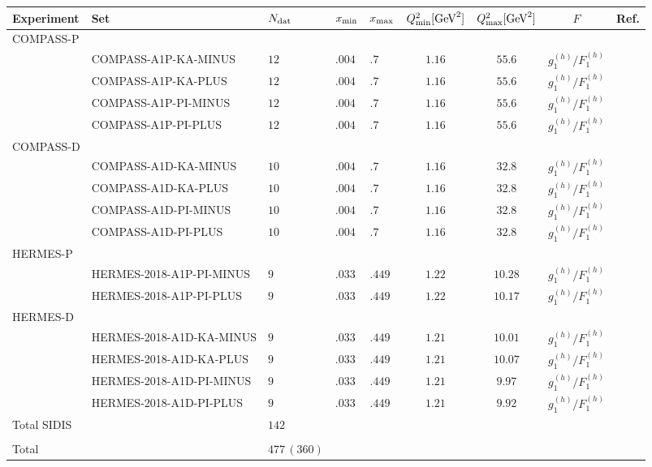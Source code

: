 \begin{tabularx}{1\pdfpagewidth}{llXXXcccc}
  \toprule \toprule
   Experiment    & Set       &  $N_{\textrm{dat}}$  &  $x_{\textrm{min}}$  &  $x_{\textrm{max}}$  & $Q^2_{\textrm{min}} [\textrm{GeV}^2]$ &  $Q^2_{\textrm{max}} [\textrm{GeV}^2]$ &    $F$    &  Ref. \\
  \midrule
   COMPASS-P 
     \\          & COMPASS-A1P-KA-MINUS & $12$ & $.004$ & $.7$ & $1.16$ & $55.6$ & $g_1^{(h)}/F_1^{(h)}$ & \cite{COMPASS:2010hwr} \\
                 & COMPASS-A1P-KA-PLUS & $12$ & $.004$ & $.7$ & $1.16$ & $55.6$ & $g_1^{(h)}/F_1^{(h)}$ & \cite{COMPASS:2010hwr} \\
                 & COMPASS-A1P-PI-MINUS & $12$ & $.004$ & $.7$ & $1.16$ & $55.6$ & $g_1^{(h)}/F_1^{(h)}$ & \cite{COMPASS:2010hwr} \\
                 & COMPASS-A1P-PI-PLUS & $12$ & $.004$ & $.7$ & $1.16$ & $55.6$ & $g_1^{(h)}/F_1^{(h)}$ & \cite{COMPASS:2010hwr} \\
  \midrule
   COMPASS-D 
     \\          & COMPASS-A1D-KA-MINUS & $10$ & $.004$ & $.7$ & $1.16$ & $32.8$ & $g_1^{(h)}/F_1^{(h)}$ & \cite{COMPASS:2010hwr} \\
                 & COMPASS-A1D-KA-PLUS & $10$ & $.004$ & $.7$ & $1.16$ & $32.8$ & $g_1^{(h)}/F_1^{(h)}$ & \cite{COMPASS:2010hwr} \\
                 & COMPASS-A1D-PI-MINUS & $10$ & $.004$ & $.7$ & $1.16$ & $32.8$ & $g_1^{(h)}/F_1^{(h)}$ & \cite{COMPASS:2010hwr} \\
                 & COMPASS-A1D-PI-PLUS & $10$ & $.004$ & $.7$ & $1.16$ & $32.8$ & $g_1^{(h)}/F_1^{(h)}$ & \cite{COMPASS:2010hwr} \\
  \midrule
   HERMES-P 
     \\          & HERMES-2018-A1P-PI-MINUS & $9$ & $.033$ & $.449$ & $1.22$ & $10.28$ & $g_1^{(h)}/F_1^{(h)}$ & \cite{HERMES:2018awh} \\
                 & HERMES-2018-A1P-PI-PLUS & $9$ & $.033$ & $.449$ & $1.22$ & $10.17$ & $g_1^{(h)}/F_1^{(h)}$ & \cite{HERMES:2018awh} \\ 
  \midrule
   HERMES-D 
     \\          & HERMES-2018-A1D-KA-MINUS & $9$ & $.033$ & $.449$ & $1.21$ & $10.01$ & $g_1^{(h)}/F_1^{(h)}$ & \cite{HERMES:2018awh} \\
                 & HERMES-2018-A1D-KA-PLUS & $9$ & $.033$ & $.449$ & $1.21$ & $10.07$ & $g_1^{(h)}/F_1^{(h)}$ & \cite{HERMES:2018awh} \\
                 & HERMES-2018-A1D-PI-MINUS & $9$ & $.033$ & $.449$ & $1.21$ & $9.97$ & $g_1^{(h)}/F_1^{(h)}$ & \cite{HERMES:2018awh} \\
                 & HERMES-2018-A1D-PI-PLUS & $9$ & $.033$ & $.449$ & $1.21$ & $9.92$ & $g_1^{(h)}/F_1^{(h)}$ & \cite{HERMES:2018awh}\\
  \midrule
   Total  SIDIS        &    & $142$  &      &      &         &     &     &      \\
  \midrule \toprule
   \\[0.5pt]
   Total & & $477 \, (360)$ & & & & & & \\
  \bottomrule
\end{tabularx}